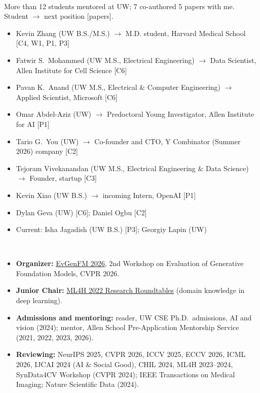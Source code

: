 \documentclass[10pt,letterpaper]{article}
\newcommand{\cvsec}[1]{\vspace{3.2mm}{\large\scshape\bfseries #1}\,\hrulefill\par\vspace{1.6mm}}
\begin{document}
\cvsec{Mentoring}
More than 12 students mentored at UW; 7 co-authored 5 papers with me. Student $\rightarrow$ next position [papers].
\begin{itemize}[leftmargin=1.4em,itemsep=1.5pt,topsep=2pt]
  \item Kevin Zhang (UW B.S./M.S.) $\rightarrow$ M.D. student, Harvard Medical School [C4, W1, P1, P3]
  \item Fatwir S.\ Mohammed (UW M.S., Electrical Engineering) $\rightarrow$ Data Scientist, Allen Institute for Cell Science [C6]
  \item Pavan K.\ Anand (UW M.S., Electrical \& Computer Engineering) $\rightarrow$ Applied Scientist, Microsoft [C6]
  \item Omar Abdel-Aziz (UW) $\rightarrow$ Predoctoral Young Investigator, Allen Institute for AI [P1]
  \item Tario G.\ You (UW) $\rightarrow$ Co-founder and CTO, Y Combinator (Summer 2026) company [C2]
  \item Tejoram Vivekanandan (UW M.S., Electrical Engineering \& Data Science) $\rightarrow$ Founder, startup [C3]
  \item Kevin Xiao (UW B.S.) $\rightarrow$ incoming Intern, OpenAI [P1]
  \item Dylan Geva (UW) [C6]; Daniel Ogbu [C2]
  \item Current: Isha Jagadish (UW B.S.) [P3]; Georgiy Lapin (UW)
\end{itemize}

\cvsec{Service}
\begin{itemize}[leftmargin=1.4em,itemsep=1.5pt,topsep=2pt]
  \item \textbf{Organizer:} \href{https://evgenfm2026.github.io/}{EvGenFM 2026}, 2nd Workshop on Evaluation of Generative Foundation Models, CVPR 2026.
  \item \textbf{Junior Chair:} \href{http://ml4h.cc/2022/research_roundtables.html}{ML4H 2022 Research Roundtables} (domain knowledge in deep learning).
  \item \textbf{Admissions and mentoring:} reader, UW CSE Ph.D.\ admissions, AI and vision (2024); mentor, Allen School Pre-Application Mentorship Service (2021, 2022, 2023, 2026).
  \item \textbf{Reviewing:} NeurIPS 2025, CVPR 2026, ICCV 2025, ECCV 2026, ICML 2026, IJCAI 2024 (AI \& Social Good), CHIL 2024, ML4H 2023--2024, SynData4CV Workshop (CVPR 2024); IEEE Transactions on Medical Imaging; Nature Scientific Data (2024).
\end{itemize}
\end{document}
